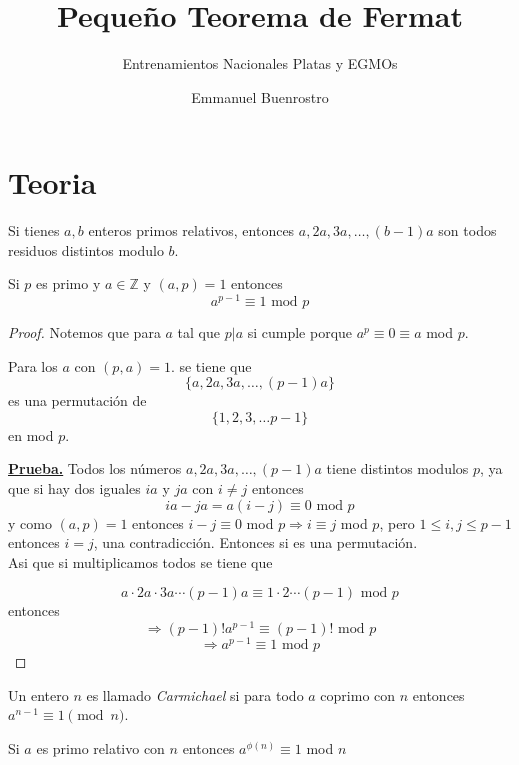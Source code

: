 \documentclass[11pt]{scrartcl}
\title {Pequeño Teorema de Fermat}
\subtitle{Entrenamientos Nacionales Platas y EGMOs}
\author{Emmanuel Buenrostro}
\begin{document}
\maketitle

\section{Teoria}

\begin{lemma}
    Si tienes $a,b$ enteros primos relativos, entonces $a,2a,3a, \ldots, (b-1)a$ son todos residuos distintos modulo $b$.
\end{lemma}


\begin{theorem}
 Si $p$ es primo y $a\in \mathbb{Z}$ y $(a,p)=1$ entonces 
$$a^{p-1} \equiv 1 \text{ mod } p$$
\end{theorem}

\begin{proof}
Notemos que para $a$ tal que $p|a$ si cumple porque $a^p\equiv 0 \equiv a$ mod $p$.

Para los $a$ con $(p,a)=1$. se tiene que 
$$\{a,2a,3a, \ldots, (p-1)a\}$$
es una permutación de 
$$\{1,2,3,\ldots p-1\}$$
en mod $p$. 

\underline{\textbf{Prueba.}} Todos los números $a,2a,3a,\ldots, (p-1)a$ tiene distintos modulos $p$, ya que si hay dos iguales $ia$ y $ja$ con $i\neq j$ entonces 
$$ia-ja= a(i-j) \equiv 0 \text{ mod } p$$
y como $(a,p)=1$ entonces $i-j \equiv 0$ mod $p \Rightarrow i\equiv j$ mod $p$, pero $1\leq i,j \leq p-1$ entonces $i=j$, una contradicción.
Entonces si es una permutación.  \\

Asi que si multiplicamos todos se tiene que 

$$a\cdot 2a\cdot 3a \cdots (p-1)a \equiv 1\cdot 2 \cdots (p-1) \text{ mod } p$$
entonces
$$ \Rightarrow(p-1)!a^{p-1}\equiv (p-1)! \text{ mod } p $$
$$ \Rightarrow a^{p-1}\equiv 1 \text{ mod }p$$
\end{proof}
\begin{remark*}
    Un entero $n$ es llamado \textit{Carmichael} si para todo $a$ coprimo con $n$ entonces $a^{n-1} \equiv 1 \pmod n $.
\end{remark*}

\begin{theorem}
 Si $a$ es primo relativo con $n$ entonces $a^{\phi(n)}\equiv 1$ mod $n$
\end{theorem}
\end{document}
